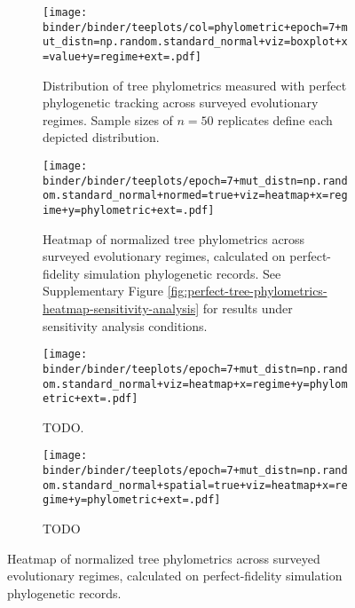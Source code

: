 \begin{figure*}
  \centering
  \begin{subfigure}[b]{\textwidth}
    \texttt{[image: binder/binder/teeplots/col=phylometric+epoch=7+mut\_distn=np.random.standard\_normal+viz=boxplot+x=value+y=regime+ext=.pdf]}
  \caption{%
    Distribution of tree phylometrics measured with perfect phylogenetic tracking across surveyed evolutionary regimes.
    Sample sizes of $n=50$ replicates define each depicted distribution.
  }
  \label{fig:perfect-tree-phylometrics}
  \end{subfigure}
  \vspace{1cm}
  \begin{subfigure}[b]{\textwidth}
  \texttt{[image: binder/binder/teeplots/epoch=7+mut\_distn=np.random.standard\_normal+normed=true+viz=heatmap+x=regime+y=phylometric+ext=.pdf]}
  \caption{%
    Heatmap of normalized tree phylometrics across surveyed evolutionary regimes, calculated on perfect-fidelity simulation phylogenetic records.
    See Supplementary Figure \ref{fig:perfect-tree-phylometrics-heatmap-sensitivity-analysis} for results under sensitivity analysis conditions.
  }
  \label{fig:perfect-tree-phylometrics-heatmap}
  \end{subfigure}
  \vspace{1cm}
  \begin{subfigure}[b]{\textwidth}
    \texttt{[image: binder/binder/teeplots/epoch=7+mut\_distn=np.random.standard\_normal+viz=heatmap+x=regime+y=phylometric+ext=.pdf]}
    \caption{TODO.}
  \end{subfigure}%
  \begin{subfigure}[b]{\textwidth}
    \texttt{[image: binder/binder/teeplots/epoch=7+mut\_distn=np.random.standard\_normal+spatial=true+viz=heatmap+x=regime+y=phylometric+ext=.pdf]}
    \caption{TODO}
  \end{subfigure}
  \caption{Heatmap of normalized tree phylometrics across surveyed evolutionary regimes, calculated on perfect-fidelity simulation phylogenetic records.}
  \label{fig:perfect-tree-phylometrics-compound}
\end{figure*}
